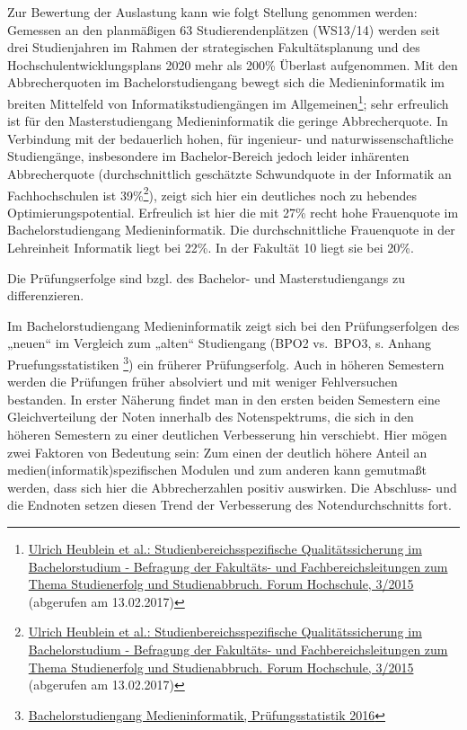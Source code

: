 Zur Bewertung der Auslastung kann wie folgt Stellung genommen werden:
Gemessen an den planmäßigen 63 Studierendenplätzen (WS13/14) werden seit
drei Studienjahren im Rahmen der strategischen Fakultätsplanung und des
Hochschulentwicklungsplans 2020 mehr als 200\% Überlast aufgenommen. Mit
den Abbrecherquoten im Bachelorstudiengang bewegt sich die
Medieninformatik im breiten Mittelfeld von Informatikstudiengängen im
Allgemeinen\footnote{\href{http://www.dzhw.eu/pdf/pub_fh/fh-201503.pdf}{Ulrich
  Heublein et al.: Studienbereichsspezifische Qualitätssicherung im
  Bachelorstudium - Befragung der Fakultäts- und Fachbereichsleitungen
  zum Thema Studienerfolg und Studienabbruch. Forum Hochschule, 3/2015}
  (abgerufen am 13.02.2017)}; sehr erfreulich ist für den
Masterstudiengang Medieninformatik die geringe Abbrecherquote. In
Verbindung mit der bedauerlich hohen, für ingenieur- und
naturwissenschaftliche Studiengänge, insbesondere im Bachelor-Bereich
jedoch leider inhärenten Abbrecherquote (durchschnittlich geschätzte
Schwundquote in der Informatik an Fachhochschulen ist 39\%\footnote{\href{http://www.dzhw.eu/pdf/pub_fh/fh-201503.pdf}{Ulrich
  Heublein et al.: Studienbereichsspezifische Qualitätssicherung im
  Bachelorstudium - Befragung der Fakultäts- und Fachbereichsleitungen
  zum Thema Studienerfolg und Studienabbruch. Forum Hochschule, 3/2015}
  (abgerufen am 13.02.2017)}), zeigt sich hier ein deutliches noch zu
hebendes Optimierungspotential. Erfreulich ist hier die mit 27\% recht
hohe Frauenquote im Bachelorstudiengang Medieninformatik. Die
durchschnittliche Frauenquote in der Lehreinheit Informatik liegt bei
22\%. In der Fakultät 10 liegt sie bei 20\%.

Die Prüfungserfolge sind bzgl. des Bachelor- und Masterstudiengangs zu
differenzieren.

Im Bachelorstudiengang Medieninformatik zeigt sich bei den
Prüfungserfolgen des „neuen`` im Vergleich zum „alten`` Studiengang
(BPO2 vs.~BPO3, s. Anhang Pruefungsstatistiken \footnote{\href{../anhaenge/pruefungsstatistiken.pdf}{Bachelorstudiengang
  Medieninformatik, Prüfungsstatistik 2016}}) ein früherer
Prüfungserfolg. Auch in höheren Semestern werden die Prüfungen früher
absolviert und mit weniger Fehlversuchen bestanden. In erster Näherung
findet man in den ersten beiden Semestern eine Gleichverteilung der
Noten innerhalb des Notenspektrums, die sich in den höheren Semestern zu
einer deutlichen Verbesserung hin verschiebt. Hier mögen zwei Faktoren
von Bedeutung sein: Zum einen der deutlich höhere Anteil an
medien(informatik)spezifischen Modulen und zum anderen kann gemutmaßt
werden, dass sich hier die Abbrecherzahlen positiv auswirken. Die
Abschluss- und die Endnoten setzen diesen Trend der Verbesserung des
Notendurchschnitts fort.

